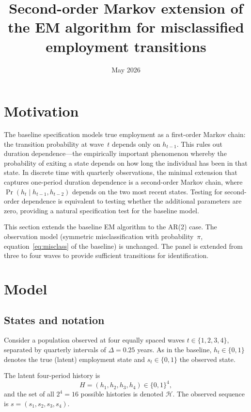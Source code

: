 \documentclass[12pt]{article}
\begin{document}
\title{Second-order Markov extension of the EM algorithm for misclassified
employment transitions}
\author{}
\date{May 2026}
\maketitle

\section{Motivation}

The baseline specification models true employment as a first-order
Markov chain: the transition probability at wave~$t$ depends only on
$h_{t-1}$. This rules out duration dependence---the empirically
important phenomenon whereby the probability of exiting a state depends
on how long the individual has been in that state. In discrete time with
quarterly observations, the minimal extension that captures
one-period duration dependence is a second-order Markov chain, where
$\Pr(h_t \mid h_{t-1}, h_{t-2})$ depends on the two most recent states.
Testing for second-order dependence is equivalent to testing whether the
additional parameters are zero, providing a natural specification test
for the baseline model.

This section extends the baseline EM algorithm to the AR(2) case. The
observation model (symmetric misclassification with probability~$\pi$,
equation~\eqref{eq:misclass} of the baseline) is unchanged. The panel
is extended from three to four waves to provide sufficient transitions
for identification.

\section{Model}

\subsection{States and notation}

Consider a population observed at four equally spaced waves
$t \in \{1, 2, 3, 4\}$, separated by quarterly intervals of
$\Delta = 0.25$ years. As in the baseline, $h_t \in \{0,1\}$ denotes
the true (latent) employment state and $s_t \in \{0,1\}$ the observed
state.

The latent four-period history is
\[
H = (h_1, h_2, h_3, h_4) \in \{0,1\}^4,
\]
and the set of all $2^4 = 16$ possible histories is denoted
$\mathcal{H}$. The observed sequence is
$s = (s_1, s_2, s_3, s_4)$.
\end{document}
